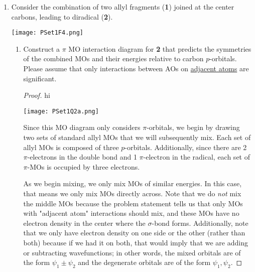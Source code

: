 \documentclass[../psets.tex]{subfiles}
\begin{document}
\begin{enumerate}
\begin{enumerate}
\begin{proof}
            Since the HOMO gets more stabilized as $\theta$ decreases,
            \begin{center}
            \end{center}
            Since the LUMO also gets more stabilized as $\theta$ decreases,
            \begin{center}
            \end{center}
        \end{proof}
    \end{enumerate}
    \item Consider the combination of two allyl fragments (\textbf{1}) joined at the center carbons, leading to diradical (\textbf{2}).
    \begin{center}
        \texttt{[image: PSet1F4.png]}
    \end{center}
    \begin{enumerate}
        \item Construct a $\pi$ MO interaction diagram for \textbf{2} that predicts the symmetries of the combined MOs and their energies relative to carbon $p$-orbitals. Please assume that only interactions between AOs on \underline{adjacent atoms} are significant.
        \begin{proof}
            {\color{white}hi}
            \begin{center}
                \texttt{[image: PSet1Q2a.png]}
            \end{center}
            Since this MO diagram only considers $\pi$-orbitals, we begin by drawing two sets of standard allyl MOs that we will subsequently mix. Each set of allyl MOs is composed of three $p$-orbitals. Additionally, since there are 2 $\pi$-electrons in the double bond and 1 $\pi$-electron in the radical, each set of $\pi$-MOs is occupied by three electrons.\par
            As we begin mixing, we only mix MOs of similar energies. In this case, that means we only mix MOs directly across. Note that we do \emph{not} mix the middle MOs because the problem statement tells us that only MOs with "adjacent atom" interactions should mix, and these MOs have no electron density in the center where the $\sigma$-bond forms. Additionally, note that we only have electron density on one side or the other (rather than both) because if we had it on both, that would imply that we are adding or subtracting wavefunctions; in other words, the mixed orbitals are of the form $\psi_1\pm\psi_2$ and the degenerate orbitals are of the form $\psi_1,\psi_2$.

\end{proof}
\end{enumerate}
\end{enumerate}
\end{document}
